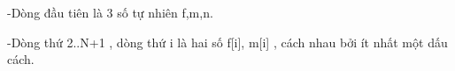 -Dòng đầu tiên là 3 số tự nhiên f,m,n.  

   -Dòng thứ 2..N+1 , dòng thứ i là hai số f[i], m[i] , cách nhau bởi ít nhất một dấu cách.